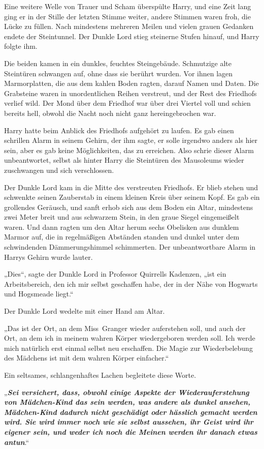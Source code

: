 {Eine weitere Welle von Trauer und Scham überspülte Harry, und eine Zeit lang ging er in der Stille der letzten Stimme weiter, andere Stimmen waren froh, die Lücke zu füllen. Nach mindestens mehreren Meilen und vielen grauen Gedanken endete der Steintunnel. Der Dunkle Lord stieg steinerne Stufen hinauf, und Harry folgte ihm.

Die beiden kamen in ein dunkles, feuchtes Steingebäude. Schmutzige alte Steintüren schwangen auf, ohne dass sie berührt wurden. Vor ihnen lagen Marmorplatten, die aus dem kahlen Boden ragten, darauf Namen und Daten. Die Grabsteine waren in unordentlichen Reihen verstreut, und der Rest des Friedhofs verlief wild. Der Mond über dem Friedhof war über drei Viertel voll und schien bereits hell, obwohl die Nacht noch nicht ganz hereingebrochen war.

Harry hatte beim Anblick des Friedhofs aufgehört zu laufen. Es gab einen schrillen Alarm in seinem Gehirn, der ihm sagte, er solle irgendwo anders als hier sein, aber es gab keine Möglichkeiten, das zu erreichen. Also schrie dieser Alarm unbeantwortet, selbst als hinter Harry die Steintüren des Mausoleums wieder zuschwangen und sich verschlossen.

Der Dunkle Lord kam in die Mitte des verstreuten Friedhofs. Er blieb stehen und schwenkte seinen Zauberstab in einem kleinen Kreis über seinem Kopf. Es gab ein grollendes Geräusch, und sanft erhob sich aus dem Boden ein Altar, mindestens zwei Meter breit und aus schwarzem Stein, in den graue Siegel eingemeißelt waren. Und dann ragten um den Altar herum sechs Obelisken aus dunklem Marmor auf, die in regelmäßigen Abständen standen und dunkel unter dem schwindenden Dämmerungshimmel schimmerten. Der unbeantwortbare Alarm in Harrys Gehirn wurde lauter.

„Dies“, sagte der Dunkle Lord in Professor Quirrells Kadenzen, „ist ein Arbeitsbereich, den ich mir selbst geschaffen habe, der in der Nähe von Hogwarts und Hogsmeade liegt.“

Der Dunkle Lord wedelte mit einer Hand am Altar.

„Das ist der Ort, an dem Miss~Granger wieder auferstehen soll, und auch der Ort, an dem ich in meinem wahren Körper wiedergeboren werden soll. Ich werde mich natürlich erst einmal selbst neu erschaffen. Die Magie zur Wiederbelebung des Mädchens ist mit dem wahren Körper einfacher.“

Ein seltsames, schlangenhaftes Lachen begleitete diese Worte.

„\textbf{\emph{Sei versichert, dass, obwohl einige Aspekte der Wiederauferstehung von Mädchen-Kind das sein werden, was andere als dunkel ansehen, Mädchen-Kind dadurch nicht geschädigt oder hässlich gemacht werden wird. Sie wird immer noch wie sie selbst aussehen, ihr Geist wird ihr eigener sein, und weder ich noch die Meinen werden ihr danach etwas antun}}.“

}
